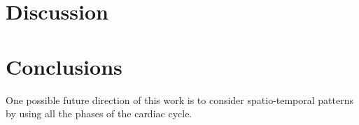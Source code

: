 \documentclass[twocolumn]{llncs}
\begin{document}
\section{Discussion}

\section{Conclusions}
One possible future direction of this work is to consider spatio-temporal patterns by using all the phases of the cardiac cycle.

\newpage

%
% 
% 
%
\end{document}
